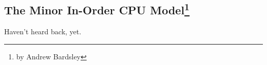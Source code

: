\subsection[The Minor In-Order CPU Model]{The Minor In-Order CPU Model\footnote{by Andrew Bardsley}}

Haven't heard back, yet.


